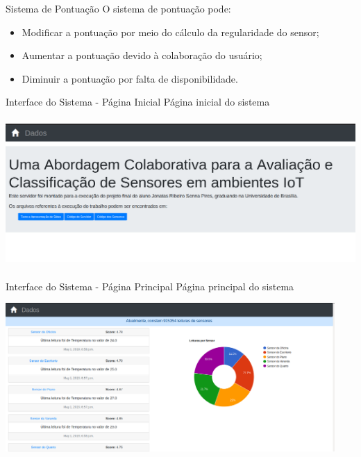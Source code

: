 \documentclass{beamer}
\begin{document}
  \begin{frame}{Sistema de Pontuação}
    \quad O sistema de pontuação pode:
    \begin{itemize}
      \item Modificar a pontuação por meio do cálculo da regularidade do sensor;
      \item Aumentar a pontuação devido à colaboração do usuário;
      \item Diminuir a pontuação por falta de disponibilidade.
    \end{itemize}
  \end{frame}

  \begin{frame}{Interface do Sistema - Página Inicial}
    \quad Página inicial do sistema
    \begin{center}
    \includegraphics[height=160pt, width=\textwidth]{inicial}
    \end{center}
  \end{frame}
  \begin{frame}{Interface do Sistema - Página Principal}
    \quad Página principal do sistema
    \begin{center}
    \includegraphics[height=160pt, width=\textwidth]{principal}
    \end{center}
  \end{frame}
\end{document}
